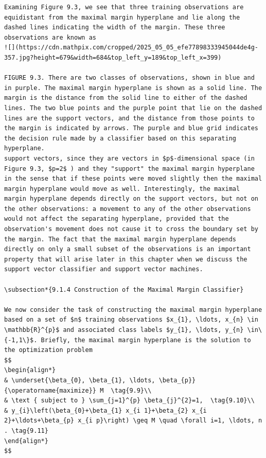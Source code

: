 \documentclass[10pt]{article}
\begin{document}
\begin{verbatim}
Examining Figure 9.3, we see that three training observations are equidistant from the maximal margin hyperplane and lie along the dashed lines indicating the width of the margin. These three observations are known as
![](https://cdn.mathpix.com/cropped/2025_05_05_efe77898333945044de4g-357.jpg?height=679&width=684&top_left_y=189&top_left_x=399)

FIGURE 9.3. There are two classes of observations, shown in blue and in purple. The maximal margin hyperplane is shown as a solid line. The margin is the distance from the solid line to either of the dashed lines. The two blue points and the purple point that lie on the dashed lines are the support vectors, and the distance from those points to the margin is indicated by arrows. The purple and blue grid indicates the decision rule made by a classifier based on this separating hyperplane.
support vectors, since they are vectors in $p$-dimensional space (in Figure 9.3, $p=2$ ) and they "support" the maximal margin hyperplane in the sense that if these points were moved slightly then the maximal margin hyperplane would move as well. Interestingly, the maximal margin hyperplane depends directly on the support vectors, but not on the other observations: a movement to any of the other observations would not affect the separating hyperplane, provided that the observation's movement does not cause it to cross the boundary set by the margin. The fact that the maximal margin hyperplane depends directly on only a small subset of the observations is an important property that will arise later in this chapter when we discuss the support vector classifier and support vector machines.

\subsection*{9.1.4 Construction of the Maximal Margin Classifier}

We now consider the task of constructing the maximal margin hyperplane based on a set of $n$ training observations $x_{1}, \ldots, x_{n} \in \mathbb{R}^{p}$ and associated class labels $y_{1}, \ldots, y_{n} \in\{-1,1\}$. Briefly, the maximal margin hyperplane is the solution to the optimization problem
$$
\begin{align*}
& \underset{\beta_{0}, \beta_{1}, \ldots, \beta_{p}}{\operatorname{maximize}} M  \tag{9.9}\\
& \text { subject to } \sum_{j=1}^{p} \beta_{j}^{2}=1,  \tag{9.10}\\
& y_{i}\left(\beta_{0}+\beta_{1} x_{i 1}+\beta_{2} x_{i 2}+\ldots+\beta_{p} x_{i p}\right) \geq M \quad \forall i=1, \ldots, n . \tag{9.11}
\end{align*}
$$


\end{verbatim}
\end{document}
